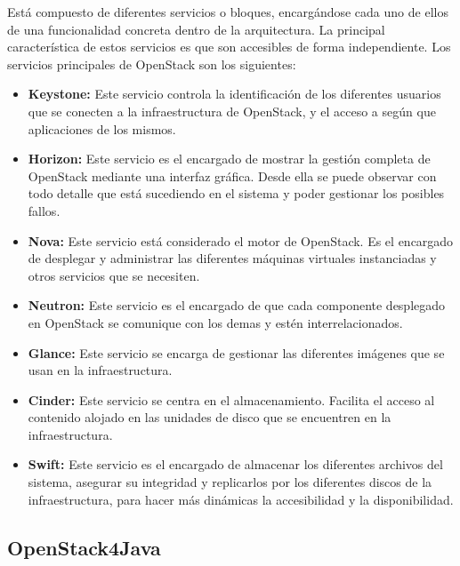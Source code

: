 Está compuesto de diferentes servicios o bloques, encargándose cada uno de ellos de una funcionalidad concreta dentro de la arquitectura. La principal característica de estos servicios es que son accesibles de forma independiente. Los servicios principales de OpenStack son los siguientes:

\begin{itemize}
	\item \textbf{Keystone:}  Este servicio controla la identificación de los diferentes usuarios que se conecten a la infraestructura de OpenStack, y el acceso a según que aplicaciones de los mismos.
	
	\item \textbf{Horizon:} Este servicio es el encargado de mostrar la gestión completa de OpenStack mediante una interfaz gráfica. Desde ella se puede observar con todo detalle que está sucediendo en el sistema y poder gestionar los posibles fallos.
	
	\item \textbf{Nova:} Este servicio está considerado el motor de OpenStack. Es el encargado de desplegar y administrar las diferentes máquinas virtuales instanciadas y otros servicios que se necesiten.
	
	\item \textbf{Neutron:} Este servicio es el encargado de que cada componente desplegado en OpenStack se comunique con los demas y estén interrelacionados.
	
	\item \textbf{Glance:} Este servicio se encarga de gestionar las diferentes imágenes que se usan en la infraestructura.
	
	\item \textbf{Cinder:} Este servicio se centra en el almacenamiento. Facilita el acceso al contenido alojado en las unidades de disco que se encuentren en la infraestructura.
	
	\item \textbf{Swift:} Este servicio es el encargado de almacenar los diferentes archivos del sistema, asegurar su integridad y replicarlos por los diferentes discos de la infraestructura, para hacer más dinámicas la accesibilidad y la disponibilidad.
\end{itemize}

\subsection{OpenStack4Java}
\label{subsec:openstack4j}

